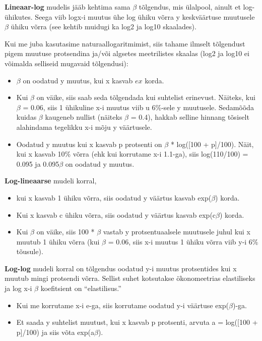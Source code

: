 \documentclass[]{book}
\begin{document}
\textbf{Lineaar-log} mudelis jääb kehtima sama \(\beta\) tõlgendus, mis ülalpool, ainult et log-ühikutes. Seega viib logx-i muutus ühe log ühiku võrra y keskväärtuse muutusele \(\beta\) ühiku võrra (see kehtib muidugi ka log2 ja log10 skaalades).

Kui me juba kasutasime naturaallogaritmimist, siis tahame ilmselt tõlgendust pigem muutuse protsendina ja/või algsetes meetrilistes skaalas (log2 ja log10 ei võimalda selliseid mugavaid tõlgendusi):

\begin{itemize}
\item
  \(\beta\) on oodatud y muutus, kui x kasvab \(ex\) korda.
\item
  Kui \(\beta\) on väike, siis saab seda tõlgendada kui suhtelist erinevust. Näiteks, kui \(\beta\) = 0.06, siis 1 ühikuline x-i muutus viib u 6\%-sele y muutusele. Sedamõõda kuidas \(\beta\) kaugeneb nullist (näiteks \(\beta\) = 0.4), hakkab selline hinnang tõsiselt alahindama tegelikku x-i mõju y väärtusele.
\item
  Oodatud y muutus kui x kasvab p protsenti on \(\beta\) * log({[}100 + p{]}/100). Näit, kui x kasvab 10\% võrra (ehk kui korrutame x-i 1.1-ga), siis log(110/100) = 0.095 ja 0.095\(\beta\) on oodatud y muutus.
\end{itemize}

\textbf{Log-lineaarse} mudeli korral,

\begin{itemize}
\item
  kui x kasvab 1 ühiku võrra, siis oodatud y väärtus kasvab exp(\(\beta\)) korda.
\item
  Kui x kasvab c ühiku võrra, siis oodatud y väärtus kasvab exp(c\(\beta\)) korda.
\item
  Kui \(\beta\) on väike, siis 100 * \(\beta\) vastab y protsentuaalsele muutusele juhul kui x muutub 1 ühiku võrra (kui \(\beta\) = 0.06, siis x-i muutus 1 ühiku võrra viib y-i 6\% tõusule).
\end{itemize}

\textbf{Log-log} mudeli korral on tõlgendus oodatud y-i muutus protsentides kui x muutub mingi protsendi võrra. Sellist suhet kotsutakse ökonomeetrias elastiliseks ja log x-i \(\beta\) koefitsient on ``elastilisus.''

\begin{itemize}
\item
  Kui me korrutame x-i e-ga, siis korrutame oodatud y-i väärtuse exp(\(\beta\))-ga.
\item
  Et saada y suhtelist muutust, kui x kasvab p protsenti, arvuta a = log({[}100 + p{]}/100) ja siis võta exp(a\(\beta\)).
\end{itemize}
\end{document}
